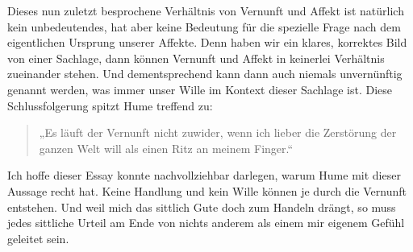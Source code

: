 \documentclass[ngerman,12pt]{diazessay} %
\begin{document}
\begin{doublespace}
Dieses nun zuletzt besprochene Verhältnis von Vernunft und Affekt ist natürlich kein unbedeutendes, hat aber keine Bedeutung für die spezielle Frage nach dem eigentlichen Ursprung unserer Affekte. Denn haben wir ein klares, korrektes Bild von einer Sachlage, dann können Vernunft und Affekt in keinerlei Verhältnis zueinander stehen. Und dementsprechend kann dann auch niemals unvernünftig genannt werden, was immer unser Wille im Kontext dieser Sachlage ist.
Diese Schlussfolgerung spitzt Hume treffend zu:
\begin{quote}
„Es läuft der Vernunft nicht zuwider,
wenn ich lieber die Zerstörung der ganzen Welt will als einen
Ritz an meinem Finger.“ \cite[siehe S.487]{Hume.2013}
\end{quote}
Ich hoffe dieser Essay konnte nachvollziehbar darlegen, warum Hume mit dieser Aussage recht hat. Keine Handlung und kein Wille können je durch die Vernunft entstehen. Und weil mich das sittlich Gute doch zum Handeln drängt, so muss jedes sittliche Urteil am Ende von nichts anderem als einem mir eigenem Gefühl geleitet sein.
\printbibliography


\end{doublespace}
\end{document}
